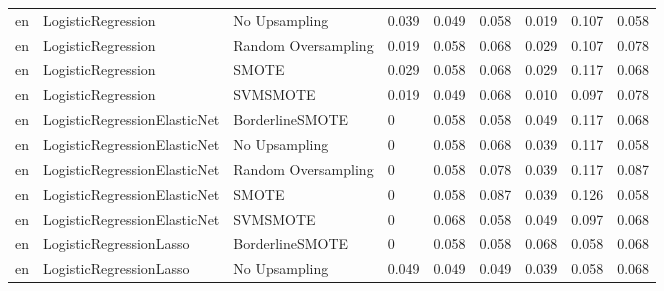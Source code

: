 \begin{tabular}{lllllllll}
      en &           LogisticRegression &       No Upsampling & 0.039 &                     0.049 &                 0.058 &                  0.019 &                                   0.107 &     0.058 \\
      en &           LogisticRegression & Random Oversampling & 0.019 &                     0.058 &                 0.068 &                  0.029 &                                   0.107 &     0.078 \\
      en &           LogisticRegression &               SMOTE & 0.029 &                     0.058 &                 0.068 &                  0.029 &                                   0.117 &     0.068 \\
      en &           LogisticRegression &            SVMSMOTE & 0.019 &                     0.049 &                 0.068 &                  0.010 &                                   0.097 &     0.078 \\
      en & LogisticRegressionElasticNet &     BorderlineSMOTE &     0 &                     0.058 &                 0.058 &                  0.049 &                                   0.117 &     0.068 \\
      en & LogisticRegressionElasticNet &       No Upsampling &     0 &                     0.058 &                 0.068 &                  0.039 &                                   0.117 &     0.058 \\
      en & LogisticRegressionElasticNet & Random Oversampling &     0 &                     0.058 &                 0.078 &                  0.039 &                                   0.117 &     0.087 \\
      en & LogisticRegressionElasticNet &               SMOTE &     0 &                     0.058 &                 0.087 &                  0.039 &                                   0.126 &     0.058 \\
      en & LogisticRegressionElasticNet &            SVMSMOTE &     0 &                     0.068 &                 0.058 &                  0.049 &                                   0.097 &     0.068 \\
      en &      LogisticRegressionLasso &     BorderlineSMOTE &     0 &                     0.058 &                 0.058 &                  0.068 &                                   0.058 &     0.068 \\
      en &      LogisticRegressionLasso &       No Upsampling & 0.049 &                     0.049 &                 0.049 &                  0.039 &                                   0.058 &     0.068 \\

\end{tabular}
